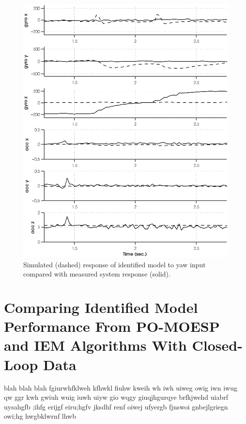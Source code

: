 \newpage
\begin{figure}[htb!]
	\centering
	\includegraphics{../fig/sim_1760_yaw.eps}
	\caption{Simulated (dashed) response of identified model to yaw input compared with measured system response (solid).}
\end{figure}\clearpage


\newpage
\section{Comparing Identified Model Performance From PO-MOESP and IEM Algorithms With Closed-Loop Data}
blah blah blah fgiurwhfklweh kfhwkl fiuhw kweih wh iwh uiweg owig iwn iwug qw ggr kwh gwiuh wuig iuwh uiyw gio wqgy  giuqjhgurqye brfkjwehd uiabrf uysahgfb ;ihfg erijgf eiru;hgfv jksdhf renf oiwej ufyergb fjnswoi gnbejlgriegn owi;hg hwgbklwrnf lhwb

